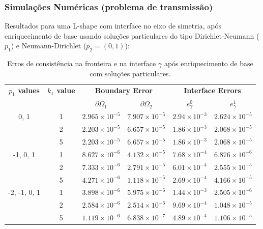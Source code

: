 \documentclass[portuguese,notheorems]{beamer}
\begin{document}
\begin{frame}\frametitle{Simulações Numéricas (problema de transmissão)}
    Resultados para uma L-shape com interface no eixo de simetria, após enriquecimento de base usando soluções particulares do tipo Dirichlet-Neumann (\(p_1\)) e Neumann-Dirichlet (\(p_2 = (0, 1)\)):
    \begin{table}
        \centering
        \scriptsize %
        \setlength{\tabcolsep}{2pt} %
        \begin{tabular}{cccccc}
            \toprule
            \multicolumn{1}{c}{\textbf{\(p_1\) values}} & \multicolumn{1}{c}{\textbf{\(k_1\) value}} & \multicolumn{2}{c}{\textbf{Boundary Error}} & \multicolumn{2}{c}{\textbf{Interface Errors}} \\
            \cmidrule(lr){2-2} \cmidrule(lr){3-4} \cmidrule(lr){5-6}
            & & \textbf{$\partial\Omega_1$} & \textbf{$\partial\Omega_2$} & \textbf{\(e_\gamma^0\)} & \textbf{\(e_\gamma^1\)} \\
            \midrule

            0, 1 & 1 & $2.965\times10^{-5}$ & $7.907\times10^{-5}$ & $2.94\times10^{-3}$ & $2.624\times10^{-5}$ \\
            & 2 & $2.203\times10^{-5}$ & $6.657\times10^{-5}$ & $1.86\times10^{-3}$ & $2.068\times10^{-5}$ \\
            & 5 & $2.203\times10^{-5}$ & $6.657\times10^{-5}$ & $1.86\times10^{-3}$ & $2.068\times10^{-5}$ \\
            \midrule

            -1, 0, 1 & 1 & $8.627\times10^{-6}$ & $4.132\times10^{-5}$ & $7.68\times10^{-4}$ & $6.876\times10^{-6}$ \\
            & 2 & $7.333\times10^{-6}$ & $2.791\times10^{-5}$ & $6.01\times10^{-4}$ & $2.555\times10^{-5}$ \\
            & 5 & $4.271\times10^{-6}$ & $1.118\times10^{-5}$ & $2.69\times10^{-4}$ & $4.166\times10^{-5}$ \\
            \midrule

            -2, -1, 0, 1 & 1 & $3.898\times10^{-6}$ & $5.975\times10^{-6}$ & $1.44\times10^{-3}$ & $2.505\times10^{-6}$ \\
            & 2 & $2.584\times10^{-6}$ & $2.514\times10^{-6}$ & $9.69\times10^{-4}$ & $1.048\times10^{-5}$ \\
            & 5 & $1.119\times10^{-6}$ & $6.838\times10^{-7}$ & $4.89\times10^{-4}$ & $1.106\times10^{-5}$ \\
            \bottomrule
        \end{tabular}
        \caption{Erros de consistência na fronteira e na interface \(\gamma\) após enriquecimento de base com soluções particulares.}
        \label{tab:transmission_results_L_shape_axis_particular}
    \end{table}
\end{frame}
\end{document}
